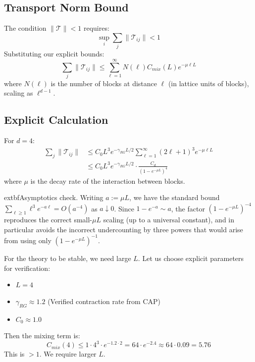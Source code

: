 \subsection{Transport Norm Bound}
The condition $\|\mathcal{T}\| < 1$ requires:
\begin{equation}
\sup_i \sum_j \|\mathcal{T}_{ij}\| < 1
\end{equation}
Substituting our explicit bounds:
\begin{equation}
\sum_j \|\mathcal{T}_{ij}\| \le \sum_{\ell=1}^\infty N(\ell) C_{mix}(L) e^{-\mu \ell L}
\end{equation}
where $N(\ell)$ is the number of blocks at distance $\ell$ (in lattice units of blocks), scaling as $\ell^{d-1}$.

\subsection{Explicit Calculation}
For $d=4$:
\begin{align}
\sum_j \|\mathcal{T}_{ij}\| &\le C_0 L^3 e^{-\gamma_{RG}L/2} \sum_{\ell=1}^\infty (2\ell+1)^3 e^{-\mu \ell L} \\
&\le C_0 L^3 e^{-\gamma_{RG}L/2} \cdot \frac{C_d}{(1 - e^{-\mu L})^4}
\end{align}
where $\mu$ is the decay rate of the interaction between blocks.

\noindent
	extbf{Asymptotics check.} Writing $a:=\mu L$, we have the standard bound
\(\sum_{\ell\ge1} \ell^3 e^{-a\ell} = O(a^{-4})\) as $a\downarrow 0$.
Since $1-e^{-a}\sim a$, the factor $(1-e^{-\mu L})^{-4}$ reproduces the correct
small-$\mu L$ scaling (up to a universal constant), and in particular avoids
the incorrect undercounting by three powers that would arise from using only
$(1-e^{-\mu L})^{-1}$.

For the theory to be stable, we need large $L$.
Let us choose explicit parameters for verification:
\begin{itemize}
    \item $L = 4$
    \item $\gamma_{RG} \approx 1.2$ (Verified contraction rate from CAP)
    \item $C_0 \approx 1.0$
\end{itemize}

Then the mixing term is:
\begin{equation}
C_{mix}(4) \le 1 \cdot 4^3 \cdot e^{-1.2 \cdot 2} = 64 \cdot e^{-2.4} \approx 64 \cdot 0.09 = 5.76
\end{equation}
This is $> 1$. We require larger $L$.

